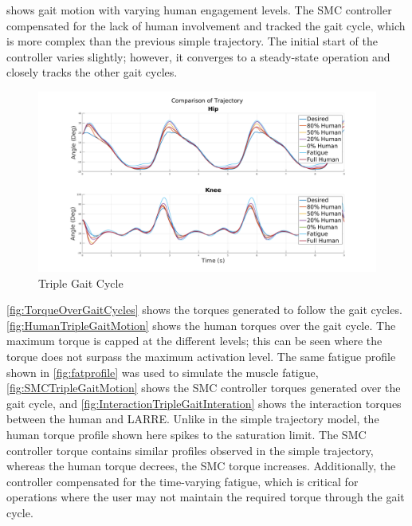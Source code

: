 \author{fig:TripleGaitMotion} shows gait motion with varying human engagement levels. The SMC controller compensated for the lack of human involvement and tracked the gait cycle, which is more complex than the previous simple trajectory. The initial start of the controller varies slightly; however, it converges to a steady-state operation and closely tracks the other gait cycles. 

\begin{figure}
    \centering
    \includegraphics[width=\columnwidth]{images/controllers/gait/traj.png}
    \caption{Triple Gait Cycle}
    \label{fig:TripleGaitMotion}
\end{figure}



\autoref{fig:TorqueOverGaitCycles} shows the torques generated to follow the gait cycles. \autoref{fig:HumanTripleGaitMotion} shows the human torques over the gait cycle. The maximum torque is capped at the different levels; this can be seen where the torque does not surpass the maximum activation level. The same fatigue profile shown in \autoref{fig:fatprofile} was used to simulate the muscle fatigue, \autoref{fig:SMCTripleGaitMotion} shows the SMC controller torques generated over the gait cycle, and \autoref{fig:InteractionTripleGaitInteration} shows the interaction torques between the human and LARRE. Unlike in the simple trajectory model, the human torque profile shown here spikes to the saturation limit. The SMC controller torque contains similar profiles observed in the simple trajectory, whereas the human torque decrees, the SMC torque increases. Additionally, the controller compensated for the time-varying fatigue, which is critical for operations where the user may not maintain the required torque through the gait cycle. 

